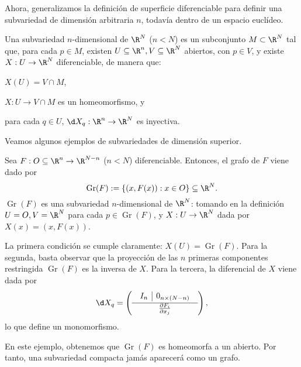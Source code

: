 Ahora, generalizamos la definición de superficie diferenciable para definir una
subvariedad de dimensión arbitraria $n$, todavía dentro de un espacio euclídeo.
\begin{ndef}
  Una subvariedad $n$-dimensional de $\R^{N}$ ($n<N$) es un subconjunto
  $M\subset \R^{N}$ tal que, para cada $p\in M$, existen
  $U\subseteq \R^{n}, V\subseteq \R^{N}$ abiertos, con $p\in V$, y existe
  $X: U\to \R^{N}$ diferenciable, de manera que:
  \begin{nlist}
  \item
    $X(U) = V\cap M$,
  \item
    $X: U\to V\cap M$ es un homeomorfismo, y
  \item
    para cada $q\in U$, $\d X_{q}: \R^{n} \to \R^{N}$ es inyectiva.
  \end{nlist}
\end{ndef}

Veamos algunos ejemplos de subvariedades de dimensión superior.
\begin{ejemplo}[Grafos]
  Sea $F: O\subseteq\R^{n}\to \R^{N-n}$ ($n<N$) diferenciable. Entonces, el
  grafo de $F$ viene dado por
  \[
    \operatorname{Gr}(F) := \left\{ (x,F(x)) : x\in O \right\} \subseteq \R^{N}
  .\]
$\operatorname{Gr}(F)$ es una subvariedad $n$-dimensional de $\R^{N}$: tomando en
la definición $U=O, V=\R^{N}$ para cada $p\in \operatorname{Gr}(F)$, y $X: U\to
\R^{N}$ dada por $X(x) = (x, F(x))$.

La primera condición se cumple claramente: $X(U) = \operatorname{Gr}(F)$.  Para
la segunda, basta observar que la proyección de las $n$ primeras componentes
restringida $\operatorname{Gr}(F)$ es la inversa de $X$. Para la tercera, la
diferencial de $X$ viene dada por
\[ %
  \d X_{q} = \left(
    \begin{array}{c}
      \begin{array}{c|c}
      I_{n} &  0_{n\times (N-n)}
      \end{array}
\\[2pt]\hline
      \frac{\partial F_{i}}{\partial x_{j}}
    \end{array}
     \right) 
,\]
lo que define un monomorfismo.   

En este ejemplo, obtenemos que $\operatorname{Gr}(F)$ es homeomorfa a un
abierto. Por tanto, una subvariedad compacta jamás aparecerá como un grafo.
\end{ejemplo}

